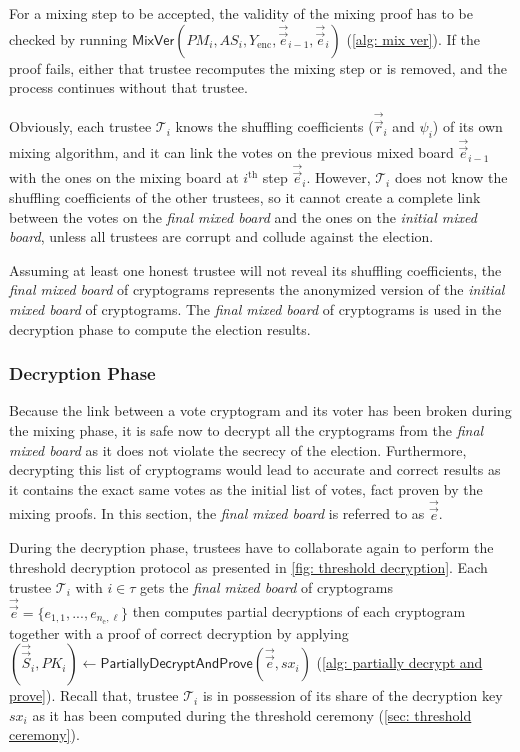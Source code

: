 For a mixing step to be accepted, the validity of the mixing proof has to be checked by running $\mathsf{MixVer}(PM_i, AS_i, Y_\mathrm{enc}, \vec{\vec{e}}_{i-1}, \vec{\vec{e}}_i)$ (\cref{alg: mix ver}). If the proof fails, either that trustee recomputes the mixing step or is removed, and the process continues without that trustee.

Obviously, each trustee $\mathcal{T}_i$ knows the shuffling coefficients ($\vec{\vec{r}}_i$ and $\psi_i$) of its own mixing algorithm, and it can link the votes on the previous mixed board $\vec{\vec{e}}_{i-1}$ with the ones on the mixing board at $i^\mathrm{th}$ step $\vec{\vec{e}}_i$. However, $\mathcal{T}_i$ does not know the shuffling coefficients of the other trustees, so it cannot create a complete link between the votes on the \textit{final mixed board} and the ones on the \textit{initial mixed board}, unless all trustees are corrupt and collude against the election.

Assuming at least one honest trustee will not reveal its shuffling coefficients, the \textit{final mixed board} of cryptograms represents the anonymized version of the \textit{initial mixed board} of cryptograms. The \textit{final mixed board} of cryptograms is used in the decryption phase to compute the election results.


\subsubsection{Decryption Phase} \label{sec: decryption phase}
Because the link between a vote cryptogram and its voter has been broken during the mixing phase, it is safe now to decrypt all the cryptograms from the \textit{final mixed board} as it does not violate the secrecy of the election. Furthermore, decrypting this list of cryptograms would lead to accurate and correct results as it contains the exact same votes as the initial list of votes, fact proven by the mixing proofs. In this section, the \textit{final mixed board} is referred to as $\vec{\vec{e}}$.

During the decryption phase, trustees have to collaborate again to perform the threshold decryption protocol as presented in \cref{fig: threshold decryption}. Each trustee $\mathcal{T}_i$ with $i \in \tau$ gets the \textit{final mixed board} of cryptograms $\vec{\vec{e}} = \{ e_{1, 1}, ..., e_{n_\mathrm{e}, \ell} \}$ then computes partial decryptions of each cryptogram together with a proof of correct decryption by applying $(\vec{\vec{S}}_i, PK_i) \gets \mathsf{PartiallyDecryptAndProve}(\vec{\vec{e}}, sx_i)$ (\cref{alg: partially decrypt and prove}). Recall that, trustee $\mathcal{T}_i$ is in possession of its share of the decryption key $sx_i$ as it has been computed during the threshold ceremony (\cref{sec: threshold ceremony}).

